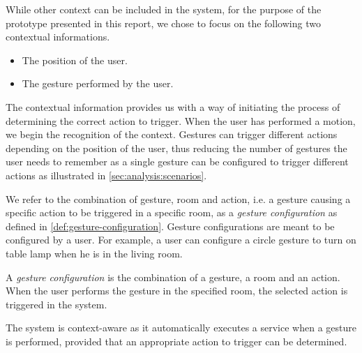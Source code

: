 While other context can be included in the system, for the purpose of the prototype presented in this report, we chose to focus on the following two contextual informations.

\begin{itemize}
\item The position of the user.
\item The gesture performed by the user.
\end{itemize}

The contextual information provides us with a way of initiating the process of determining the correct action to trigger. When the user has performed a motion, we begin the recognition of the context. Gestures can trigger different actions depending on the position of the user, thus reducing the number of gestures the user needs to remember as a single gesture can be configured to trigger different actions as illustrated in \cref{sec:analysis:scenarios}.

We refer to the combination of gesture, room and action, i.e. a gesture causing a specific action to be triggered in a specific room, as a \emph{gesture configuration} as defined in \cref{def:gesture-configuration}. Gesture configurations are meant to be configured by a user. For example, a user can configure a circle gesture to turn on table lamp when he is in the living room.

\begin{definition}
\label{def:gesture-configuration}
A \emph{gesture configuration} is the combination of a gesture, a room and an action. When the user performs the gesture in the specified room, the selected action is triggered in the system.
\end{definition}

The system is context-aware as it automatically executes a service when a gesture is performed, provided that an appropriate action to trigger can be determined.

